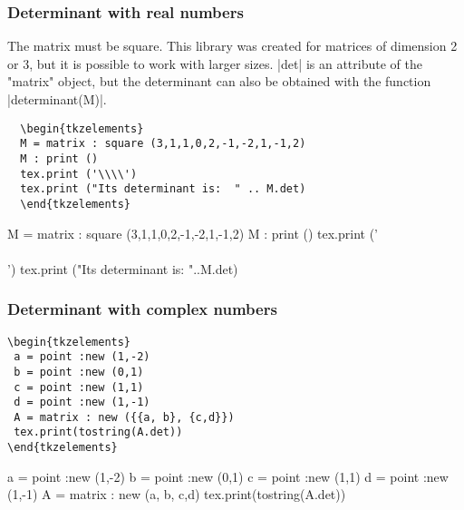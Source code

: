 \subsubsection{Determinant with real numbers} %
\label{ssub:determinant_matrix}
The matrix must be square. This library was created for matrices of dimension 2 or 3, but it is possible to work with larger sizes. |det| is an attribute of the "matrix" object, but the determinant can also be obtained with the function |determinant(M)|.

\vspace{.5em}
\begin{minipage}{.6\textwidth}
\begin{Verbatim}
  \begin{tkzelements}
  M = matrix : square (3,1,1,0,2,-1,-2,1,-1,2)
  M : print ()
  tex.print ('\\\\')
  tex.print ("Its determinant is:  " .. M.det)
  \end{tkzelements}
\end{Verbatim}
\end{minipage}
\begin{minipage}{.4\textwidth}
\begin{tkzelements}
M = matrix : square (3,1,1,0,2,-1,-2,1,-1,2)
M : print ()
tex.print ('\\\\')
tex.print ("Its determinant is:  "..M.det)
\end{tkzelements}
\end{minipage}

\subsubsection{Determinant with complex numbers} %
\label{ssub:determinant_with_complex_numbers}

\begin{minipage}{.5\textwidth}
\begin{Verbatim}
\begin{tkzelements}
 a = point :new (1,-2)
 b = point :new (0,1)
 c = point :new (1,1)
 d = point :new (1,-1)
 A = matrix : new ({{a, b}, {c,d}})
 tex.print(tostring(A.det))
\end{tkzelements}
\end{Verbatim}
\end{minipage}
\begin{minipage}{.5\textwidth}
\begin{tkzelements}
 a = point :new (1,-2)
 b = point :new (0,1)
 c = point :new (1,1)
 d = point :new (1,-1)
 A = matrix : new ({{a, b}, {c,d}})
 tex.print(tostring(A.det))
\end{tkzelements}
\end{minipage}




